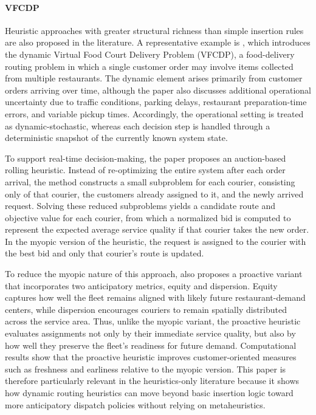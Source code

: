 \paragraph{VFCDP}
Heuristic approaches with greater structural richness than simple insertion rules are also proposed in the literature. 
A representative example is \cite{steeverDynamicCourierRouting2019}, which introduces the dynamic Virtual Food Court 
Delivery Problem (VFCDP), a food-delivery routing problem in which a single customer order may involve items collected 
from multiple restaurants. The dynamic element arises primarily from customer orders arriving over time, although the paper 
also discusses additional operational uncertainty due to traffic conditions, parking delays, restaurant preparation-time errors, 
and variable pickup times. Accordingly, the operational setting is treated as dynamic-stochastic, whereas each decision step 
is handled through a deterministic snapshot of the currently known system state.

To support real-time decision-making, the paper proposes an auction-based rolling heuristic. Instead of re-optimizing the 
entire system after each order arrival, the method constructs a small subproblem for each courier, consisting only of that 
courier, the customers already assigned to it, and the newly arrived request. Solving these reduced subproblems yields a 
candidate route and objective value for each courier, from which a normalized bid is computed to represent the expected 
average service quality if that courier takes the new order. In the myopic version of the heuristic, the request is assigned 
to the courier with the best bid and only that courier's route is updated.

To reduce the myopic nature of this approach, \cite{steeverDynamicCourierRouting2019} also proposes a proactive variant 
that incorporates two anticipatory metrics, equity and dispersion. Equity captures how well the fleet remains aligned with 
likely future restaurant-demand centers, while dispersion encourages couriers to remain spatially distributed across the 
service area. Thus, unlike the myopic variant, the proactive heuristic evaluates assignments not only by their immediate 
service quality, but also by how well they preserve the fleet's readiness for future demand. Computational results show 
that the proactive heuristic improves customer-oriented measures such as freshness and earliness relative to the myopic 
version. This paper is therefore particularly relevant in the heuristics-only literature because it shows how dynamic routing 
heuristics can move beyond basic insertion logic toward more anticipatory dispatch policies without relying on metaheuristics.


